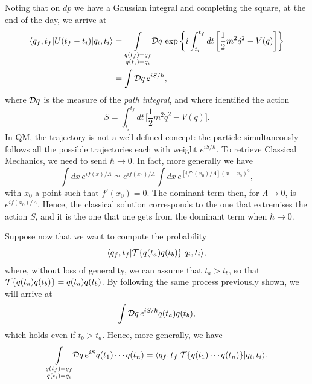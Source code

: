 Noting that on $dp$ we have a Gaussian integral and completing the square, at the end of the day, we arrive at 
\begin{equation}
    \begin{split}
        \langle q_f,t_f | U(t_f - t_i) | q_i,t_i \rangle &= \underset{\substack{q(t_f) = q_f \\ q(t_i) = q_i}}{\int} \mathcal{D} q\,\exp{\bigg\{i\int^{t_f}_{t_i}dt\,\bigg[\frac{1}{2}m^2\dot{q}^2 - V(q)\bigg]\bigg\}} \\
        &= \int \mathcal{D} q\,e^{iS/\hbar},
    \end{split}
\end{equation}
where $\mathcal{D} q$ is the measure of the \emph{path integral}, and where identified the action 
\begin{equation}
    S = \int^{t_f}_{t_i}dt\,\bigg[\frac{1}{2}m^2\dot{q}^2 - V(q)\bigg].
\end{equation}
In QM, the trajectory is not a well-defined concept: the particle simultaneously follows all the possible trajectories each with weight $e^{iS/\hbar}$. To retrieve Classical Mechanics, we need to send $\hbar \to 0$. In fact, more generally we have 
\begin{equation}
    \int dx\,e^{if(x)/\Lambda} \simeq e^{if(x_0)/\Lambda}\int dx\,e^{[if''(x_0)/\Lambda](x - x_0)^2},
\end{equation}
with $x_0$ a point such that $f'(x_0) = 0$. The dominant term then, for $\Lambda \to 0$, is $e^{if(x_0)/\Lambda}$. Hence, the classical solution corresponds to the one that extremises the action $S$, and it is the one that one gets from the dominant term when $\hbar \to 0$. 

Suppose now that we want to compute the probability
\begin{equation}
    \langle q_f,t_f | \mathcal{T}{\{q(t_a)q(t_b)\}} | q_i,t_i \rangle,
\end{equation}
where, without loss of generality, we can assume that $t_a > t_b$, so that $\mathcal{T}{\{q(t_a)q(t_b)\}} = q(t_a)q(t_b)$. By following the same process previously shown, we will arrive at 
\begin{equation}
    \int \mathcal{D} q\,e^{iS/\hbar}q(t_a)q(t_b),
\end{equation}
which holds even if $t_b > t_a$. Hence, more generally, we have 
\begin{equation}
    \underset{\substack{q(t_f) = q_f \\ q(t_i) = q_i}}{\int} \mathcal{D} q\,e^{iS}q(t_1)\cdots q(t_n) = \langle q_f,t_f | \mathcal{T}{\{q(t_1)\cdots q(t_n)\}} | q_i,t_i \rangle.
\end{equation}

